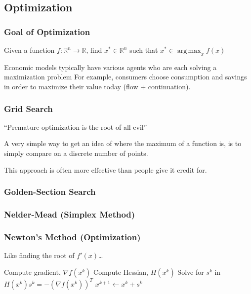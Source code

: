 \documentclass[10pt]{beamer}
\DeclareMathOperator*{\argmax}{arg\,max}
\begin{document}
\subsection{Optimization}

\begin{frame} \frametitle{Goal of Optimization}

  Given a function $f: \mathbb{R}^n \rightarrow \mathbb{R}$, find $x^* \in \mathbb{R}^n$ such that $x^* \in \argmax_x f(x)$

  Economic models typically have various agents who are each solving a maximization problem \textemdash{} For example, consumers choose consumption and savings in order to maximize their value today (flow + continuation).

\end{frame}

\begin{frame} \frametitle{Grid Search}
  ``Premature optimization is the root of all evil'' 

  \vspace{0.5cm}

  A very simple way to get an idea of where the maximum of a function is, is to simply compare on a discrete number of points.

  \vspace{0.5cm}

  This approach is often more effective than people give it credit for.

\end{frame}

\begin{frame} \frametitle{Golden-Section Search}

\end{frame}

\begin{frame} \frametitle{Nelder-Mead (Simplex Method)}

\end{frame}

\begin{frame} \frametitle{Newton's Method (Optimization)}

  Like finding the root of $f'(x)$\dots

  \vspace{0.5cm}

  \begin{algorithmic}

    \STATE Compute gradient, $\nabla f (x^k)$
    \STATE Compute Hessian, $H(x^k)$
    \STATE Solve for $s^k$ in $H(x^k) s^k = -(\nabla f(x^k))^T $
    \STATE $x^{k+1} \leftarrow x^k + s^k$
    \ENDWHILE

  \end{algorithmic}

\end{frame}
\end{document}
